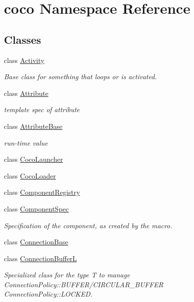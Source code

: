 \hypertarget{namespacecoco}{}\section{coco Namespace Reference}
\label{namespacecoco}
\subsection*{Classes}
\begin{DoxyCompactItemize}
\item 
class \hyperlink{classcoco_1_1_activity}{Activity}
\begin{DoxyCompactList}\small\item\em Base class for something that loops or is activated. \end{DoxyCompactList}\item 
class \hyperlink{classcoco_1_1_attribute}{Attribute}
\begin{DoxyCompactList}\small\item\em template spec of attribute \end{DoxyCompactList}\item 
class \hyperlink{classcoco_1_1_attribute_base}{Attribute\+Base}
\begin{DoxyCompactList}\small\item\em run-\/time value \end{DoxyCompactList}\item 
class \hyperlink{classcoco_1_1_coco_launcher}{Coco\+Launcher}
\item 
class \hyperlink{classcoco_1_1_coco_loader}{Coco\+Loader}
\item 
class \hyperlink{classcoco_1_1_component_registry}{Component\+Registry}
\item 
class \hyperlink{classcoco_1_1_component_spec}{Component\+Spec}
\begin{DoxyCompactList}\small\item\em Specification of the component, as created by the macro. \end{DoxyCompactList}\item 
class \hyperlink{classcoco_1_1_connection_base}{Connection\+Base}
\item 
class \hyperlink{classcoco_1_1_connection_buffer_l}{Connection\+Buffer\+L}
\begin{DoxyCompactList}\small\item\em Specialized class for the type T to manage Connection\+Policy\+::\+B\+U\+F\+F\+E\+R/\+C\+I\+R\+C\+U\+L\+A\+R\+\_\+\+B\+U\+F\+F\+E\+R Connection\+Policy\+::\+L\+O\+C\+K\+E\+D. \end{DoxyCompactList}\item 

\end{DoxyCompactItemize}
